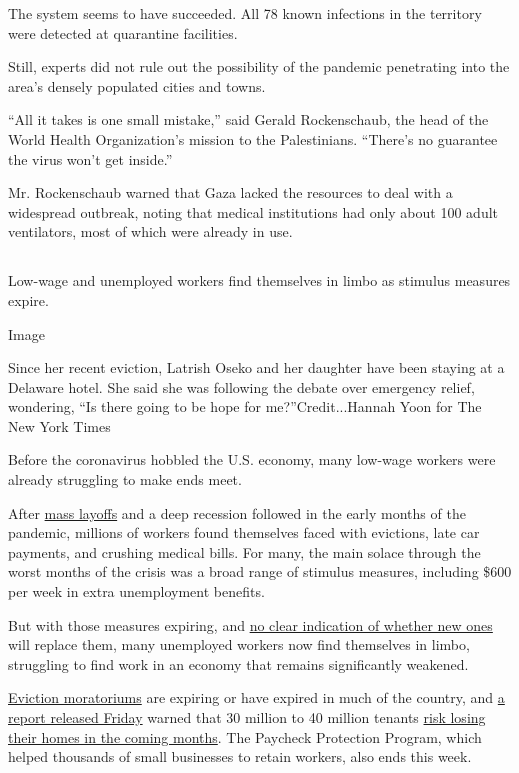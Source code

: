The system seems to have succeeded. All 78 known infections in the
territory were detected at quarantine facilities.

Still, experts did not rule out the possibility of the pandemic
penetrating into the area's densely populated cities and towns.

``All it takes is one small mistake,'' said Gerald Rockenschaub, the
head of the World Health Organization's mission to the Palestinians.
``There's no guarantee the virus won't get inside.''

Mr. Rockenschaub warned that Gaza lacked the resources to deal with a
widespread outbreak, noting that medical institutions had only about 100
adult ventilators, most of which were already in use.

\hypertarget{section-3}{%
\subsection{}\label{section-3}}

Low-wage and unemployed workers find themselves in limbo as stimulus
measures expire.

Image

Since her recent eviction, Latrish Oseko and her daughter have been
staying at a Delaware hotel. She said she was following the debate over
emergency relief, wondering, ``Is there going to be hope for
me?''Credit...Hannah Yoon for The New York Times

Before the coronavirus hobbled the U.S. economy, many low-wage workers
were already struggling to make ends meet.

After
\href{https://www.nytimes.com/interactive/2020/08/05/upshot/us-unemployment-maps-coronavirus.html}{mass
layoffs} and a deep recession followed in the early months of the
pandemic, millions of workers found themselves faced with evictions,
late car payments, and crushing medical bills. For many, the main solace
through the worst months of the crisis was a broad range of stimulus
measures, including \$600 per week in extra unemployment benefits.

But with those measures expiring, and
\href{https://www.nytimes.com/2020/08/07/us/politics/trump-congress-stimulus.html}{no
clear indication of whether new ones} will replace them, many unemployed
workers now find themselves in limbo, struggling to find work in an
economy that remains significantly weakened.

\href{https://www.nytimes.com/2020/08/07/business/economy/housing-economy-eviction-renters.html}{Eviction
moratoriums} are expiring or have expired in much of the country, and
\href{https://nlihc.org/sites/default/files/The_Eviction_Crisis_080720.pdf}{a
report released Friday} warned that 30 million to 40 million tenants
\href{https://www.nytimes.com/2020/08/07/business/economy/housing-economy-eviction-renters.html}{risk
losing their homes in the coming months}. The Paycheck Protection
Program, which helped thousands of small businesses to retain workers,
also ends this week.

